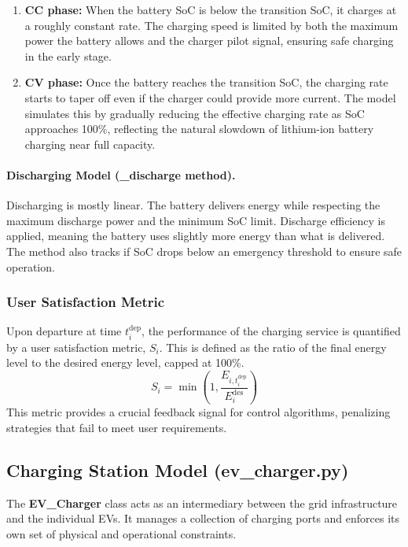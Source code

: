 \begin{enumerate}
    \item \textbf{CC phase:} When the battery SoC is below the transition SoC, it charges at a roughly constant rate. The charging speed is limited by both the maximum power the battery allows and the charger pilot signal, ensuring safe charging in the early stage.
    
    \item \textbf{CV phase:} Once the battery reaches the transition SoC, the charging rate starts to taper off even if the charger could provide more current. The model simulates this by gradually reducing the effective charging rate as SoC approaches 100\%, reflecting the natural slowdown of lithium-ion battery charging near full capacity.
\end{enumerate}

\paragraph{Discharging Model (\textbf{\_discharge} method).}
Discharging is mostly linear. The battery delivers energy while respecting the maximum discharge power and the minimum SoC limit. Discharge efficiency is applied, meaning the battery uses slightly more energy than what is delivered. The method also tracks if SoC drops below an emergency threshold to ensure safe operation.



\subsubsection{User Satisfaction Metric}
Upon departure at time $t^{\text{dep}}_i$, the performance of the charging service is quantified by a user satisfaction metric, $S_i$. This is defined as the ratio of the final energy level to the desired energy level, capped at 100\%.
\begin{equation}
    S_i = \min\left(1, \frac{E_{i, t^{\text{dep}}_i}}{E^{\text{des}}_i}\right)
\end{equation}
This metric provides a crucial feedback signal for control algorithms, penalizing strategies that fail to meet user requirements.

\subsection{Charging Station Model (\textbf{ev\_charger.py})}
The \textbf{EV\_Charger} class acts as an intermediary between the grid infrastructure and the individual EVs. It manages a collection of charging ports and enforces its own set of physical and operational constraints.

